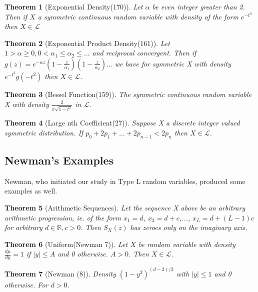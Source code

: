 \documentclass[10pt]{article}
\newcommand{\1}{\textbf{1}}
\newcommand{\R}{\mathbb{R}}
\newcommand{\lL}{\mathcal{L}}
\newtheorem{theorem}{Theorem}
\theoremstyle{remark}
\theoremstyle{definition}
\begin{document}
\begin{theorem}[Exponential Density(170)] \label{EXPDEN}
	Let $\alpha$ be even integer greater than 2. Then if $X$ a symmetric continuous random variable with density of the form $e^{-t^{\alpha}}$ then $X \in \lL$
\end{theorem}

\begin{theorem}[Exponential Product Density(161)] \label{EXPPDEN}
	Let $1 > \alpha \geq 0, 0 < \alpha_1 \leq \alpha_2 \leq ...$ and reciprocal convergent. Then if $g(z)= e^{-\alpha z} (1-\frac{z}{\alpha_1})(1-\frac{z}{\alpha_2})...$ we have for symmetric X with density $e^{-t^2} g(-t^2)$ then $X \in \lL$.
\end{theorem}

\begin{theorem}[Bessel Function(159)] \label{BF}
	The symmetric continuous random variable X with density $\frac{2}{\pi\sqrt{1-t^2}}$ in $\lL$.
\end{theorem} 

\begin{theorem}[Large nth Coefficient(27)] \label{LNC}
	Suppose X a discrete integer valued symmetric distribution. If $p_0 + 2p_1 +... + 2p_{n-1} < 2p_n$ then $X \in \lL$. 
\end{theorem}


\subsection{Newman's Examples}

Newman, who initiated our study in Type L random variables, produced some examples as well. 

\begin{theorem}[Arithmetic Sequences] \label{them:AS}
	Let the sequence X above be an arbitrary arithmetic progression, ie. of the form $x_1 = d$, $x_2 = d+c$,..., $x_L = d + (L-1)c$ for arbitrary $d \in \R, c > 0$. Then $S_X(z)$ has zeroes only on the imaginary axis.
\end{theorem}

\begin{theorem}[Uniform(Newman 7)] \label{UNI}
	Let $X$ be random variable with density $\frac{d\mu}{dy} = 1$ if $|y| \leq A$ and 0 otherwise. $A > 0$. Then $X \in \lL$.
\end{theorem}

\begin{theorem}[Newman (8)] \label{N8}
	Density $(1-y^2)^{(d-2)/2}$ with $|y| \leq 1$ and 0 otherwise. For $d > 0$. 
\end{theorem}
\end{document}
